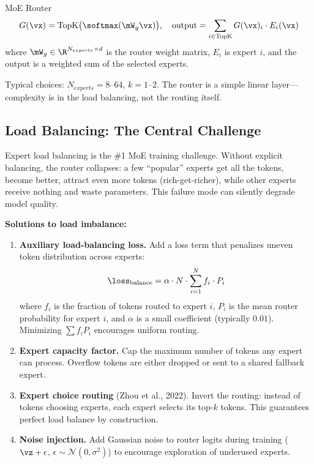 \begin{mathresult}{MoE Router}
\begin{equation}
G(\vx) = \text{TopK}\bigl(\softmax(\mW_g \vx)\bigr), \quad \text{output} = \sum_{i \in \text{TopK}} G(\vx)_i \cdot E_i(\vx)
\end{equation}
where $\mW_g \in \R^{N_{experts} \times d}$ is the router weight matrix, $E_i$ is expert $i$, and the output is a weighted sum of the selected experts.
\end{mathresult}

Typical choices: $N_{experts} = 8\text{--}64$, $k = 1\text{--}2$. The router is a simple linear layer---complexity is in the load balancing, not the routing itself.

\subsection{Load Balancing: The Central Challenge}

\begin{warningbox}
Expert load balancing is the \#1 MoE training challenge. Without explicit balancing, the router collapses: a few ``popular'' experts get all the tokens, become better, attract even more tokens (rich-get-richer), while other experts receive nothing and waste parameters. This failure mode can silently degrade model quality.
\end{warningbox}

\textbf{Solutions to load imbalance:}

\begin{enumerate}
    \item \textbf{Auxiliary load-balancing loss.} Add a loss term that penalizes uneven token distribution across experts:
    \begin{equation}
    \loss_{\text{balance}} = \alpha \cdot N \cdot \sum_{i=1}^{N} f_i \cdot P_i
    \end{equation}
    where $f_i$ is the fraction of tokens routed to expert $i$, $P_i$ is the mean router probability for expert $i$, and $\alpha$ is a small coefficient (typically $0.01$). Minimizing $\sum f_i P_i$ encourages uniform routing.

    \item \textbf{Expert capacity factor.} Cap the maximum number of tokens any expert can process. Overflow tokens are either dropped or sent to a shared fallback expert.

    \item \textbf{Expert choice routing} (Zhou et al., 2022). Invert the routing: instead of tokens choosing experts, each expert selects its top-$k$ tokens. This guarantees perfect load balance by construction.

    \item \textbf{Noise injection.} Add Gaussian noise to router logits during training ($\vz + \epsilon$, $\epsilon \sim \mathcal{N}(0, \sigma^2)$) to encourage exploration of underused experts.
\end{enumerate}

